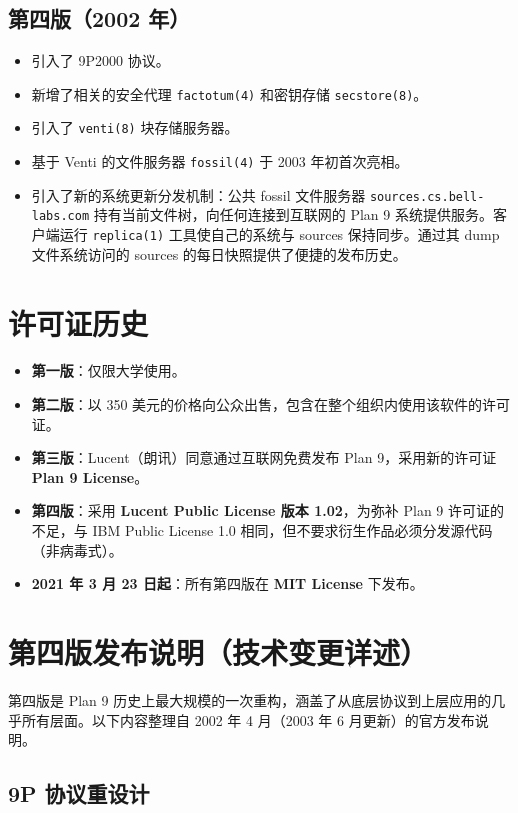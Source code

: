 \documentclass[12pt,UTF8]{ctexbook}
\begin{document}
\subsection{第四版（2002 年）}

\begin{itemize}
\item 引入了 9P2000 协议。
\item 新增了相关的安全代理 \texttt{factotum(4)} 和密钥存储 \texttt{secstore(8)}。
\item 引入了 \texttt{venti(8)} 块存储服务器。
\item 基于 Venti 的文件服务器 \texttt{fossil(4)} 于 2003 年初首次亮相。
\item 引入了新的系统更新分发机制：公共 fossil 文件服务器 \texttt{sources.cs.bell-labs.com} 持有当前文件树，向任何连接到互联网的 Plan 9 系统提供服务。客户端运行 \texttt{replica(1)} 工具使自己的系统与 sources 保持同步。通过其 dump 文件系统访问的 sources 的每日快照提供了便捷的发布历史。
\end{itemize}

\section{许可证历史}

\begin{itemize}
\item \textbf{第一版}：仅限大学使用。
\item \textbf{第二版}：以 350 美元的价格向公众出售，包含在整个组织内使用该软件的许可证。
\item \textbf{第三版}：Lucent（朗讯）同意通过互联网免费发布 Plan 9，采用新的许可证 \textbf{Plan 9 License}。
\item \textbf{第四版}：采用 \textbf{Lucent Public License 版本 1.02}，为弥补 Plan 9 许可证的不足，与 IBM Public License 1.0 相同，但不要求衍生作品必须分发源代码（非病毒式）。
\item \textbf{2021 年 3 月 23 日起}：所有第四版在 \textbf{MIT License} 下发布。
\end{itemize}

\section{第四版发布说明（技术变更详述）}

第四版是 Plan 9 历史上最大规模的一次重构，涵盖了从底层协议到上层应用的几乎所有层面。以下内容整理自 2002 年 4 月（2003 年 6 月更新）的官方发布说明。

\subsection{9P 协议重设计}
\end{document}
